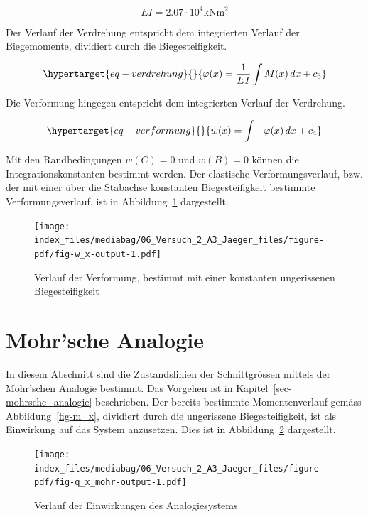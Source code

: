 \documentclass[
  12pt,
  letterpaper,
  egregdoesnotlikesansseriftitles]{scrreprt}
\begin{document}
\begin{equation}EI = 2.07 \cdot 10^{4} \text{kN} \text{m}^{2}\end{equation}

Der Verlauf der Verdrehung entspricht dem integrierten Verlauf der
Biegemomente, dividiert durch die Biegesteifigkeit.

\begin{equation}\protect\hypertarget{eq-verdrehung}{}{
\varphi(x) = \frac{1}{EI}\int M(x) \, dx + c_3
}\label{eq-verdrehung}\end{equation}

Die Verformung hingegen entspricht dem integrierten Verlauf der
Verdrehung.

\begin{equation}\protect\hypertarget{eq-verformung}{}{
w(x) = \int -\varphi(x) \, dx + c_4
}\label{eq-verformung}\end{equation}

Mit den Randbedingungen \(w(C) = 0\) und \(w(B) = 0\) können die
Integrationskonstanten bestimmt werden. Der elastische
Verformungsverlauf, bzw. der mit einer über die Stabachse konstanten
Biegesteifigkeit bestimmte Verformungsverlauf, ist in
Abbildung~\ref{fig-w_x} dargestellt.

\begin{figure}[H]

{\centering \texttt{[image: index\_files/mediabag/06\_Versuch\_2\_A3\_Jaeger\_files/figure-pdf/fig-w\_x-output-1.pdf]}

}

\caption{\label{fig-w_x}Verlauf der Verformung, bestimmt mit einer
konstanten ungerissenen Biegesteifigkeit}

\end{figure}

\hypertarget{mohrsche-analogie}{%
\section{Mohr'sche Analogie}\label{mohrsche-analogie}}

In diesem Abschnitt sind die Zustandslinien der Schnittgrössen mittels
der Mohr'schen Analogie bestimmt. Das Vorgehen ist in
Kapitel~\ref{sec-mohrsche_analogie} beschrieben. Der bereits bestimmte
Momentenverlauf gemäss Abbildung~\ref{fig-m_x}, dividiert durch die
ungerissene Biegesteifigkeit, ist als Einwirkung auf das System
anzusetzen. Dies ist in Abbildung~\ref{fig-q_x_mohr} dargestellt.

\begin{figure}[H]

{\centering \texttt{[image: index\_files/mediabag/06\_Versuch\_2\_A3\_Jaeger\_files/figure-pdf/fig-q\_x\_mohr-output-1.pdf]}

}

\caption{\label{fig-q_x_mohr}Verlauf der Einwirkungen des
Analogiesystems}

\end{figure}
\end{document}
